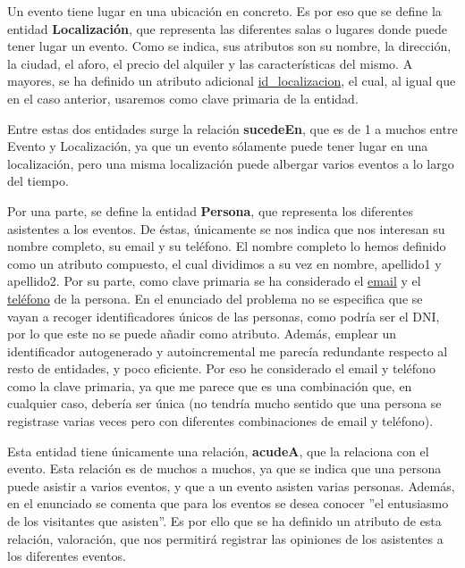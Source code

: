 \documentclass[a4paper,onecolumn]{article}
\begin{document}
\begin{sloppypar}
Un evento tiene lugar en una ubicación en concreto. Es por eso que se define la entidad \textbf{Localización}, que representa las diferentes
salas o lugares donde puede tener lugar un evento. Como se indica, sus atributos son su nombre, la dirección, la ciudad, el aforo,
el precio del alquiler y las características del mismo. A mayores, se ha definido un atributo adicional \underline{id\_localizacion},
el cual, al igual que en el caso anterior, usaremos como clave primaria de la entidad.

Entre estas dos entidades surge la relación \textbf{sucedeEn}, que es de 1 a muchos entre Evento y Localización, ya que un evento sólamente puede
tener lugar en una localización, pero una misma localización puede albergar varios eventos a lo largo del tiempo.

Por una parte, se define la entidad \textbf{Persona}, que representa los diferentes asistentes a los eventos. De éstas, únicamente se nos indica 
que nos interesan su nombre completo, su email y su teléfono. El nombre completo lo hemos definido como un atributo compuesto, el cual dividimos
a su vez en nombre, apellido1 y apellido2. Por su parte, como clave primaria se ha considerado el \underline{email} y el \underline{teléfono} de la 
persona. En el enunciado del problema no se especifica que se vayan a recoger identificadores únicos de las personas, como podría ser el DNI, por lo que
este no se puede añadir como atributo. Además, emplear un identificador autogenerado y autoincremental me parecía redundante respecto al resto de 
entidades, y poco eficiente. Por eso he considerado el email y teléfono como la clave primaria, ya que me parece que es una combinación que, en cualquier
caso, debería ser única (no tendría mucho sentido que una persona se registrase varias veces pero con diferentes combinaciones de email y teléfono).

Esta entidad tiene únicamente una relación, \textbf{acudeA}, que la relaciona con el evento. Esta relación es de muchos a muchos, ya que se indica que una persona
puede asistir a varios eventos, y que a un evento asisten varias personas. Además, en el enunciado se comenta que para los eventos se desea conocer
''el entusiasmo de los visitantes que asisten''. Es por ello que se ha definido un atributo de esta relación, valoración, que nos permitirá registrar
las opiniones de los asistentes a los diferentes eventos.


\end{sloppypar}
\end{document}
